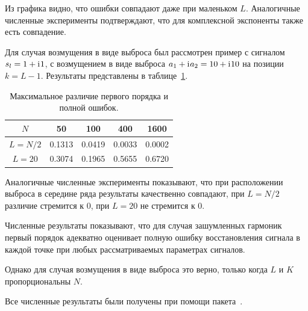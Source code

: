 \documentclass{spisok-article}
\begin{document}
Из графика видно, что ошибки совпадают даже при маленьком $L$. Аналогичные численные эксперименты подтверждают, что для комплексной экспоненты также есть совпадение.

Для случая возмущения в виде выброса был рассмотрен пример с сигналом $s_l = 1 + \mathrm{i}\mkern1mu 1$, с возмущением в виде выброса $a_1 + \mathrm{i}\mkern1mu a_2 = 10 + \mathrm{i}\mkern1mu 10$ на позиции $k = L - 1$. Результаты представлены в таблице~\ref{tab:const_outl}.

\begin{table}[H]
	\begin{center}
		\caption{Максимальное различие первого порядка и полной ошибок.}
		\label{tab:const_outl}
		\begin{tabular}{|c|c|c|c|c|}
			\hline
			$N$	& 50 & 100 & 400 & 1600 \\
			\hline
			$L = N / 2$ & 0.1313  & 0.0419  & 0.0033 & 0.0002 \\
			\hline
			$L = 20$ & 0.3074  & 0.1965  & 0.5655 & 0.6720 \\
			\hline
		\end{tabular}
	\end{center}
\end{table}

Аналогичные численные эксперименты показывают, что при расположении выброса в середине ряда результаты качественно совпадают, при $L = N/2$ различие стремится к $0$, при $L = 20$ не стремится к $0$.

Численные результаты показывают, что для случая зашумленных гармоник первый порядок адекватно оценивает полную ошибку восстановления сигнала в каждой точке при любых рассматриваемых параметрах сигналов.

Однако для случая возмущения в виде выброса это верно, только когда $L$ и $K$ пропорциональны $N$.

Все численные результаты были получены при помощи пакета~\cite{Korobeynikov.etal2014}.

\end{document}
